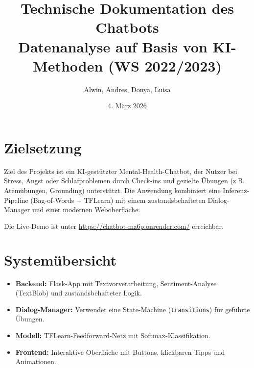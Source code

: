 \documentclass[a4paper,11pt]{article}
\title{Technische Dokumentation des Chatbots\\
\large Datenanalyse auf Basis von KI-Methoden (WS 2022/2023)}
\author{Alwin, Andres, Donya, Luisa}
\date{4. M\"arz 2026}
\begin{document}
\maketitle
\tableofcontents
\newpage

\section{Zielsetzung}
Ziel des Projekts ist ein KI-gest\"utzter Mental-Health-Chatbot, der Nutzer bei Stress, Angst oder Schlafproblemen durch Check-ins und gezielte \"Ubungen (z.B. Atem\"ubungen, Grounding) unterst\"utzt.
Die Anwendung kombiniert eine Inferenz-Pipeline (Bag-of-Words + TFLearn) mit einem zustandsbehafteten Dialog-Manager und einer modernen Weboberfl\"ache.

Die Live-Demo ist unter \href{https://chatbot-mz6p.onrender.com/}{https://chatbot-mz6p.onrender.com/} erreichbar.

\section{System\"ubersicht}
\begin{itemize}
  \item \textbf{Backend:} Flask-App mit Textvorverarbeitung, Sentiment-Analyse (TextBlob) und zustandsbehafteter Logik.
  \item \textbf{Dialog-Manager:} Verwendet eine State-Machine (\texttt{transitions}) f\"ur gef\"uhrte \"Ubungen.
  \item \textbf{Modell:} TFLearn-Feedforward-Netz mit Softmax-Klassifikation.
  \item \textbf{Frontend:} Interaktive Oberfl\"ache mit Buttons, klickbaren Tipps und Animationen.
\end{itemize}
\end{document}
